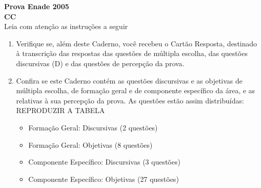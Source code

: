 \documentclass{exam}
\begin{document}
\begin{center}
\vspace*{1cm}
\LARGE \textbf{Prova Enade 2005\\ CC \\}\vspace*{0.5cm}
\Large Leia com atenção as instruções a seguir
\vspace*{0.5cm}
\end{center}

\begin{enumerate}
    \item Verifique se, além deste Caderno, você recebeu o Cartão Resposta, destinado à transcrição das respostas das questões de múltipla escolha, das questões discursivas (D) e das questões de percepção da prova.
    \item Confira se este Caderno contém as questões discursivas e as objetivas de múltipla escolha, de formação geral e de componente específico da área, e as relativas à sua percepção da prova. As questões estão assim distribuídas:
REPRODUZIR A TABELA
    \begin{itemize}

        \item Formação Geral: Discursivas (2 questões)\\
        \item Formação Geral: Objetivas  (8 questões)\\
        \item Componente Específico: Discursivas (3 questões)\\
        \item Componente Específico: Objetivas (27 questões)\\
    \end{itemize}


\end{enumerate}
\end{document}
